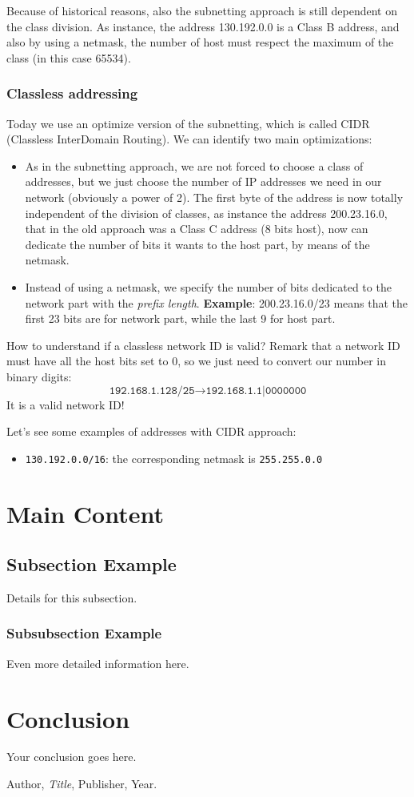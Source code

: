 Because of historical reasons, also the subnetting approach is still dependent on the class division. As instance, the address 130.192.0.0 is a Class B address, and also by using a netmask, the number of host must respect the maximum of the class (in this case 65534).

\subsubsection{Classless addressing}
Today we use an optimize version of the subnetting, which is called CIDR (Classless InterDomain Routing). We can identify two main optimizations:
\begin{itemize}
    \item As in the subnetting approach, we are not forced to choose a class of addresses, but we just choose the number of IP addresses we need in our network (obviously a power of 2). The first byte of the address is now totally independent of the division of classes, as instance the address 200.23.16.0, that in the old approach was a Class C address (8 bits host), now can dedicate the number of bits it wants to the host part, by means of the netmask.
    \item Instead of using a netmask, we specify the number of bits dedicated to the network part with the \textit{prefix length}. \textbf{Example}: 200.23.16.0/23 means that the first 23 bits are for network part, while the last 9 for host part.
\end{itemize}

\noindent How to understand if a classless network ID is valid? Remark that a network ID must have all the host bits set to 0, so we just need to convert our number in binary digits:
\[\texttt{192.168.1.128/25}\rightarrow \texttt{192.168.1.1|0000000}\]
It is a valid network ID!

Let's see some examples of addresses with CIDR approach:
\begin{itemize}
    \item \texttt{130.192.0.0/16}: the corresponding netmask is \texttt{255.255.0.0}
\end{itemize}


\section{Main Content}
\subsection{Subsection Example}
Details for this subsection.

\subsubsection{Subsubsection Example}
Even more detailed information here.

\section{Conclusion}
Your conclusion goes here.

\begin{thebibliography}{9}
 Author, \textit{Title}, Publisher, Year.
\end{thebibliography}

